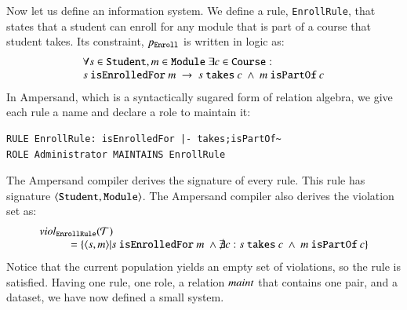 \documentclass{elsarticle}
\begin{document}
   Now let us define an information system.
   We define a rule, {\tt EnrollRule}, that states that a student can enroll for any module that is part of a course that student takes.
   Its constraint, $p_{\tt Enroll}$ is written in logic as:
\[\begin{array}{l}\forall s\in\text{\tt Student}, m\in\text{\tt Module}\ \exists c\in\text{\tt Course}:\\
s\ \text{\tt isEnrolledFor}\ m\ \rightarrow\ s\ \text{\tt takes}\ c\ \wedge\ m\ \text{\tt isPartOf}\ c
\end{array}\]
   In Ampersand, which is a syntactically sugared form of relation algebra,
   we give each rule a name and declare a role to maintain it:
\begin{verbatim}
RULE EnrollRule: isEnrolledFor |- takes;isPartOf~
ROLE Administrator MAINTAINS EnrollRule
\end{verbatim}
   The Ampersand compiler derives the signature of every rule.
   This rule has signature $\langle{\text{\tt Student}},{\text{\tt Module}}\rangle$.
   The Ampersand compiler also derives the violation set as:
\[\begin{array}{l}
   \viol{\text{\tt EnrollRule}}{\triples}\\
   \hspace{1cm}=\{\pair{s}{m}|s\ \text{\tt isEnrolledFor}\ m\ \wedge\not\exists c: s\ \text{\tt takes}\ c\ \wedge\ m\ \text{\tt isPartOf}\ c\}
\end{array}\]
   Notice that the current population yields an empty set of violations,
   so the rule is satisfied.
   Having one rule, one role, a relation $\text{\it maint\/}$ that contains one pair, and a dataset,
   we have now defined a small system.
\end{document}
